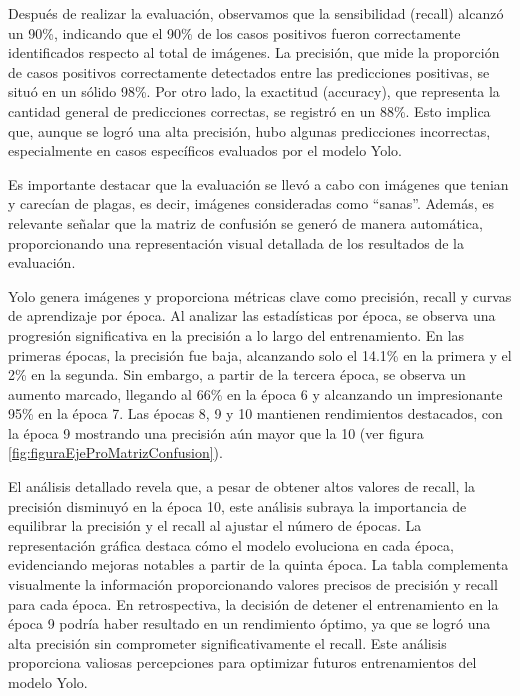 Después de realizar la evaluación, observamos que la sensibilidad (recall) alcanzó un 90\%, indicando que el 90\% de los casos positivos fueron correctamente identificados respecto al total de imágenes. La precisión, que mide la proporción de casos positivos correctamente detectados entre las predicciones positivas, se situó en un sólido 98\%. Por otro lado, la exactitud (accuracy), que representa la cantidad general de predicciones correctas, se registró en un 88\%. Esto implica que, aunque se logró una alta precisión, hubo algunas predicciones incorrectas, especialmente en casos específicos evaluados por el modelo Yolo.


\newpage

Es importante destacar que la evaluación se llevó a cabo con imágenes que tenian y carecían de plagas, es decir, imágenes consideradas como ``sanas''. Además, es relevante señalar que la matriz de confusión se generó de manera automática, proporcionando una representación visual detallada de los resultados de la evaluación.

Yolo genera imágenes y proporciona métricas clave como precisión, recall y curvas de aprendizaje por época. Al analizar las estadísticas por época, se observa una progresión significativa en la precisión a lo largo del entrenamiento. En las primeras épocas, la precisión fue baja, alcanzando solo el 14.1\% en la primera y el 2\% en la segunda. Sin embargo, a partir de la tercera época, se observa un aumento marcado, llegando al 66\% en la época 6 y alcanzando un impresionante 95\% en la época 7. Las épocas 8, 9 y 10 mantienen rendimientos destacados, con la época 9 mostrando una precisión aún mayor que la 10 (ver figura \ref{fig:figuraEjeProMatrizConfusion}).

El análisis detallado revela que, a pesar de obtener altos valores de recall, la precisión disminuyó en la época 10, este análisis subraya la importancia de equilibrar la precisión y el recall al ajustar el número de épocas. La representación gráfica destaca cómo el modelo evoluciona en cada época, evidenciando mejoras notables a partir de la quinta época. La tabla complementa visualmente la información proporcionando valores precisos de precisión y recall para cada época. En retrospectiva, la decisión de detener el entrenamiento en la época 9 podría haber resultado en un rendimiento óptimo, ya que se logró una alta precisión sin comprometer significativamente el recall. Este análisis proporciona valiosas percepciones para optimizar futuros entrenamientos del modelo Yolo.

